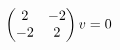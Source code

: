 \documentclass[preview]{standalone}
\begin{document}
\begin{align*}
\special{dvisvgm:raw <g id='unique000'>}\begin{pmatrix}2&-2\\-2&2\end{pmatrix}v=0\special{dvisvgm:raw </g>}
\end{align*}
\end{document}
